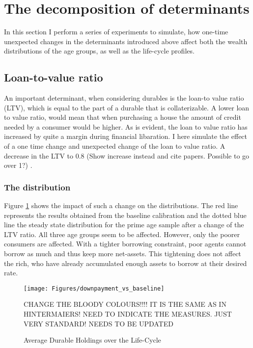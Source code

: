 \documentclass[a4paper,12pt]{article}
\begin{document}
\section{The decomposition of determinants}
In this section I perform a series of experiments to simulate, how one-time unexpected changes in the determinants introduced above affect both the wealth distributions of the age groups, as well as the life-cycle profiles. 

\subsection{Loan-to-value ratio}
An important determinant, when considering durables is the loan-to value ratio (LTV), which is equal to the part of a durable that is collaterizable. A lower loan to value ratio, would mean that when purchasing a house the amount of credit needed by a consumer would be higher. As is evident, the loan to value ratio has increased by quite a margin during financial libaration. I here simulate the effect of a one time change and unexpected change of the loan to value ratio. A decrease in the LTV to 0.8 (Show increase instead and cite papers. Possible to go over 1?) . 

\subsubsection{The distribution}
Figure \ref{downpayment_vs_baseline} shows the impact of such a change on the distributions. The red line represents the results obtained from the baseline calibration and the dotted blue line the steady state distribution for the prime age sample after a change of the LTV ratio. All three age groups seem to be affected. However, only the poorer consumers are affected. With a tighter borrowing constraint, poor agents cannot borrow as much and thus keep more net-assets. This tightening does not affect the rich, who have already accumulated enough assets to borrow at their desired rate. 

\begin{figure}[!htbp]
\caption{Average Durable Holdings over the Life-Cycle} 
\label{downpayment_vs_baseline}	%
\centering
\texttt{[image: Figures/downpayment\_vs\_baseline]}  %

\begin{minipage}{0.8\linewidth}
\footnotesize{CHANGE THE BLOODY COLOURS!!!! IT IS THE SAME AS IN HINTERMAIERS! NEED TO INDICATE THE MEASURES. JUST VERY STANDARD! NEEDS TO BE UPDATED}
\end{minipage}

\end{figure}
\end{document}
